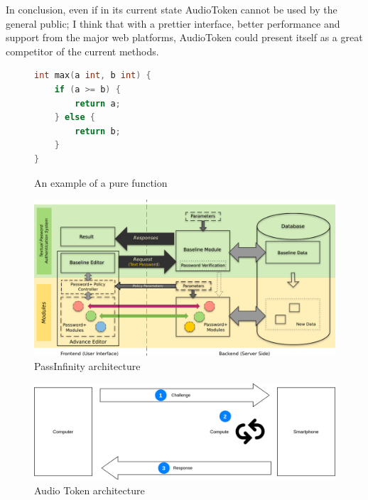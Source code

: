 \documentclass[twocolumn,14pt]{extarticle}
\begin{document}
In conclusion, even if in its current state AudioToken cannot be used by the general public; I think that with a prettier interface, better performance and support from the major web platforms, AudioToken could present itself as a great competitor of the current methods.

\onecolumn




\clearpage

\appendix
\begin{figure}[!ht]
\begin{lstlisting}[language=C]
int max(a int, b int) {
	if (a >= b) {
		return a;
	} else {
		return b;
	}
}
\end{lstlisting}
\caption{An example of a pure function}
\label{appendix:sec:purefunction}
\end{figure}

\newpage
\begin{landscape}
\begin{figure}[!ht]
\begin{center}
\includegraphics[width=20cm]{figure/architecture.png}
\caption{PassInfinity architecture}
\label{appendix:fig:passarchitecture}
\end{center}
\end{figure}
\end{landscape}

\begin{figure}[!ht]
\includegraphics[width=1\textwidth]{figure/audiotokenarchitecture.png}
\caption{Audio Token architecture}
\label{appendix:fig:audioarchitecture}
\end{figure}
\end{document}
